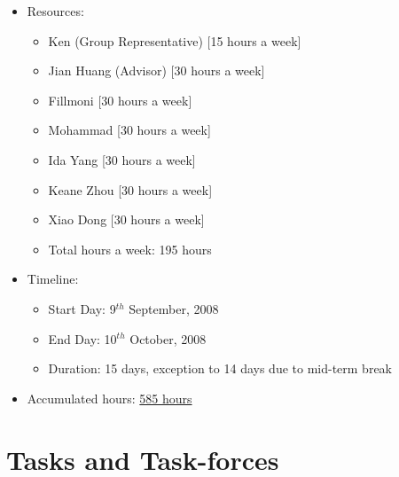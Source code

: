 \documentclass{article}
\begin{document}
\begin{itemize}
   \item Resources:
		\begin{itemize}
		   \item Ken (Group Representative) [15 hours a week]
		   \item Jian Huang (Advisor) [30 hours a week]
		   \item Fillmoni [30 hours a week]
		   \item Mohammad [30 hours a week]
		   \item Ida Yang [30 hours a week]
		   \item Keane Zhou [30 hours a week]
		   \item Xiao Dong [30 hours a week]
		   \item Total hours a week: 195 hours 
		\end{itemize}
   \item Timeline:
       \begin{itemize}
          \item Start Day: 9$^{th}$ September, 2008
          \item End Day: 10$^{th}$ October, 2008
          \item Duration: 15 days, exception to 14 days due to mid-term break
       \end{itemize}
   \item Accumulated hours: \underline{585 hours}
\end{itemize}

\section*{Tasks and Task-forces}
\end{document}
